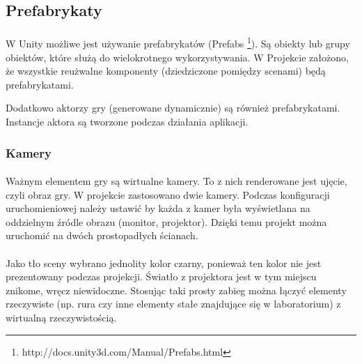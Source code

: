 \subsection{Prefabrykaty}
\paragraph{}
W Unity możliwe jest używanie prefabrykatów (Prefabs \footnote{http://docs.unity3d.com/Manual/Prefabs.html}). Są obiekty lub grupy obiektów, które służą do wielokrotnego wykorzystywania. W Projekcie założono, że wszystkie reużwalne komponenty (dziedziczone pomiędzy scenami) będą prefabrykatami.

Dodatkowo aktorzy gry (generowane dynamicznie) są również prefabrykatami. Instancje aktora są tworzone podczas działania aplikacji.

\subsubsection{Kamery}
\paragraph{}
Ważnym elementem gry są wirtualne kamery. To z nich renderowane jest ujęcie, czyli obraz gry. W projekcie zastosowano dwie kamery. Podczas konfiguracji uruchomieniowej należy ustawić by każda z kamer była wyświetlana na oddzielnym źródle obrazu (monitor, projektor). Dzięki temu projekt można uruchomić na dwóch prostopadłych ścianach.
\paragraph{}
Jako tło sceny wybrano jednolity kolor czarny, ponieważ ten kolor nie jest prezentowany podczas projekcji. Światło z projektora jest w tym miejscu znikome, wręcz niewidoczne. Stosując taki prosty zabieg można łączyć elementy rzeczywiste (np. rura czy inne elementy stałe znajdujące się w laboratorium) z wirtualną rzeczywistością.

